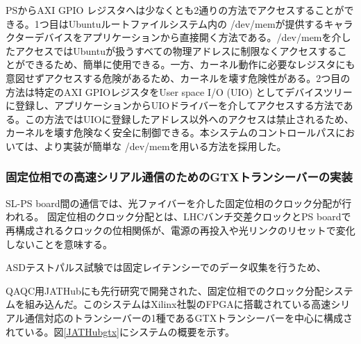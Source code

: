 PSからAXI GPIO レジスタへは少なくとも2通りの方法でアクセスすることができる。1つ目はUbuntuルートファイルシステム内の /dev/memが提供するキャラクターデバイスをアプリケーションから直接開く方法である。/dev/memを介したアクセスではUbuntuが扱うすべての物理アドレスに制限なくアクセスすることができるため、簡単に使用できる。一方、カーネル動作に必要なレジスタにも意図せずアクセスする危険があるため、カーネルを壊す危険性がある。2つ目の方法は特定のAXI GPIOレジスタをUser space I/O (UIO) としてデバイスツリーに登録し、アプリケーションからUIOドライバーを介してアクセスする方法である。この方法ではUIOに登録したアドレス以外へのアクセスは禁止されるため、カーネルを壊す危険なく安全に制御できる。本システムのコントロールパスにおいては、より実装が簡単な /dev/memを用いる方法を採用した。


\subsubsection{固定位相での高速シリアル通信のためのGTXトランシーバーの実装}
\baselineskip
\label{subsubsec_gtx}
SL-PS board間の通信では、光ファイバーを介した固定位相のクロック分配が行われる。
固定位相のクロック分配とは、LHCバンチ交差クロックとPS boardで再構成されるクロックの位相関係が、電源の再投入や光リンクのリセットで変化しないことを意味する。

ASDテストパルス試験では固定レイテンシーでのデータ収集を行うため、

QAQC用JATHubにも先行研究\cite{mt_aoki}で開発された、固定位相でのクロック分配システムを組み込んだ。このシステムはXilinx社製のFPGAに搭載されている高速シリアル通信対応のトランシーバーの1種であるGTXトランシーバーを中心に構成されている。図\ref{JATHubgtx}にシステムの概要を示す。


